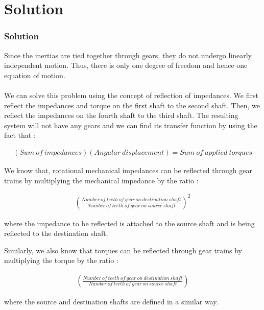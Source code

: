 \documentclass{beamer}
\theoremstyle{remark}
\numberwithin{equation}{section}
\begin{document}
\section{Solution}
\begin{frame}
\frametitle{Solution}
Since the inertias are tied together through gears, they do not undergo linearly independent motion. Thus, there
is only one degree of freedom and hence one equation of motion.\\ \ \\
    \quad We can solve this problem using the concept of reflection of impedances. We first reflect the impedances and torque on the first shaft to the second shaft. Then, we reflect the impedances on the fourth shaft to the third shaft.
    The resulting system will not have any gears and we can find its transfer function by using the fact that :

\begin{align*}
    (Sum \ of \ impedances)(Angular \ displacement) = Sum \ of \ applied \ torques
\end{align*}
\end{frame}
\begin{frame}

We know that, rotational mechanical impedances can be reflected through gear trains by multiplying the
mechanical impedance by the ratio :

\begin{align*}
    \left( \frac{Number \ of \ teeth \ of \ gear \ on \ destination \ shaft}{Number \ of \ teeth \ of \ gear \ on \ source \ shaft} \right)^2
\end{align*}

where the impedance to be reflected is attached to the source shaft and is being reflected to the destination shaft.

\end{frame}
\begin{frame}
Similarly, we also know that torques can be reflected through gear trains by multiplying the torque by the ratio :

\begin{align*}
    \left( \frac{Number \ of \ teeth \ of \ gear \ on \ destination \ shaft}{Number \ of \ teeth \ of \ gear \ on \ source \ shaft} \right)
\end{align*}

where the source and destination shafts are defined in a similar way.

\end{frame}
\end{document}
